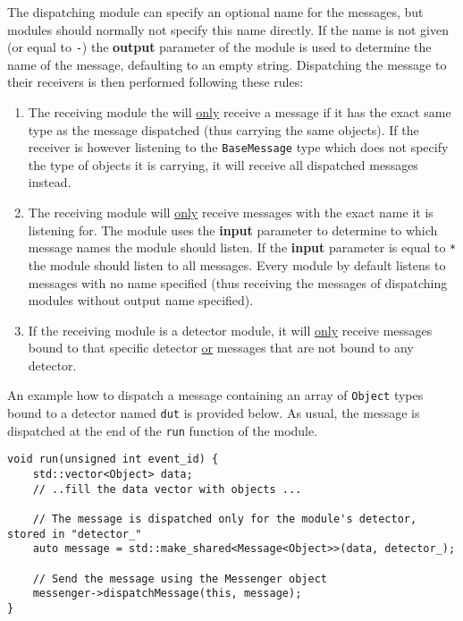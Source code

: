 The dispatching module can specify an optional name for the messages, but modules should normally not specify this name directly.
If the name is not given (or equal to \texttt{-}) the \textbf{output} parameter of the module is used to determine the name of the message, defaulting to an empty string.
Dispatching the message to their receivers is then performed following these rules:
\begin{enumerate}
\item The receiving module the will \underline{only} receive a message if it has the exact same type as the message dispatched (thus carrying the same objects).
If the receiver is however listening to the \texttt{BaseMessage} type which does not specify the type of objects it is carrying, it will receive all dispatched messages instead.
\item The receiving module will \underline{only} receive messages with the exact name it is listening for.
The module uses the \textbf{input} parameter to determine to which message names the module should listen.
If the \textbf{input} parameter is equal to \texttt{*} the module should listen to all messages.
Every module by default listens to messages with no name specified (thus receiving the messages of dispatching modules without output name specified).
\item If the receiving module is a detector module, it will \underline{only} receive messages bound to that specific detector \underline{or} messages that are not bound to any detector.
\end{enumerate}

An example how to dispatch a message containing an array of \texttt{Object} types bound to a detector named \texttt{dut} is provided below.
As usual, the message is dispatched at the end of the \texttt{run} function of the module.
\begin{verbatim}
void run(unsigned int event_id) {
    std::vector<Object> data;
    // ..fill the data vector with objects ...

    // The message is dispatched only for the module's detector, stored in "detector_"
    auto message = std::make_shared<Message<Object>>(data, detector_);

    // Send the message using the Messenger object
    messenger->dispatchMessage(this, message);
}
\end{verbatim}

